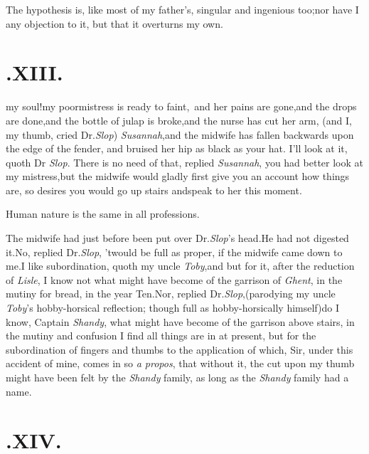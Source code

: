 \documentclass{article}
\begin{document}
The hypothesis is, like most of my father’s, singular and
ingenious too;\tsh nor have I any objection to it, but
that it overturns my own.

\null
\section{.\quad  XIII.}

 my soul!\tsh my
poor\break mistress is ready to faint,\tsh\
and her pains are gone,\tsk and the drops are done,\tsk and the bottle of julap is
broke,\tsh and the nurse has cut her arm,\break
\tsh (and I, my thumb, cried Dr.\@ \textit{Slop})
\textit{Susannah},\tsk and the midwife has fallen
backwards upon the edge of the fender, 
and bruised her hip as black as your hat.
\tsh I’ll look at it, quoth Dr \textit{Slop}.\tsh\break
There is no need of that, replied \textit{Susannah},\tsk 
you had better look at my mistress,\tsk but
the midwife would gladly first give you an account how things are, so
desires you would go up stairs and\break speak to her this moment.

Human nature is the same in all professions.

The midwife had just before been put over Dr.\@ \textit{Slop}’s head.\tsk He had not
digested it.\tsk No, replied Dr.\@ \textit{Slop}, ’twould be full as proper, if the
midwife came down to me.\tsk I like subordination,\break
quoth my uncle \textit{Toby},\tsk and but for it,
after the reduction of \textit{Lisle}, I know not what might have become of the
garrison of \textit{Ghent}, in the mutiny for bread, in the year Ten.\tsh Nor,
replied Dr.\@ \textit{Slop},\break (parodying my uncle \textit{Toby}’s hobby-horsi\-cal
reflection; though full as hobby-hor\-sically himself)\tsh do I know, Captain
\textit{Shandy}, what might have become of the garrison above stairs, in the mutiny
and confusion I find all things are in at pre\-sent, but for the subordination of
fingers and thumbs to \astvi\tsh the appli\-cation of which, Sir, under this accident
of mine, comes in so \textit{a propos}, that without it, the cut upon my thumb might
have been felt by the \textit{Shandy} family, as long as the \textit{Shandy} family
had a name.

\vfill\noindent{}

\null
\section{.\quad  XIV.}
\end{document}

